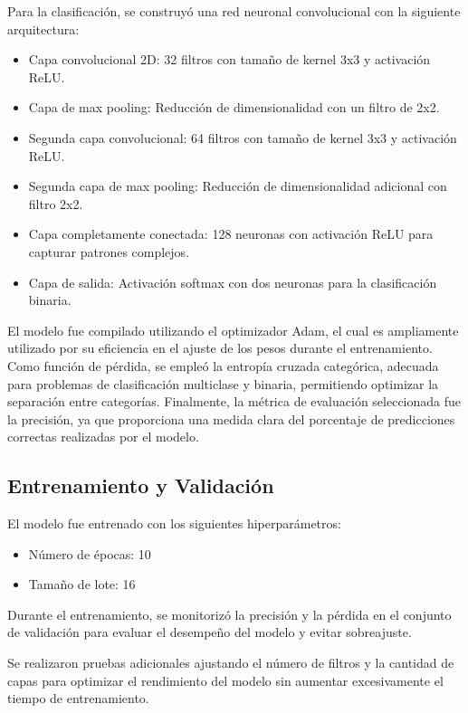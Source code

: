 \documentclass[journal]{IEEEtran}
\begin{document}
Para la clasificación, se construyó una red neuronal convolucional con la siguiente arquitectura:
\begin{itemize}
    \item Capa convolucional 2D: 32 filtros con tamaño de kernel 3x3 y activación ReLU.
    \item Capa de max pooling: Reducción de dimensionalidad con un filtro de 2x2.
    \item Segunda capa convolucional: 64 filtros con tamaño de kernel 3x3 y activación ReLU.
    \item Segunda capa de max pooling: Reducción de dimensionalidad adicional con filtro 2x2.
    \item Capa completamente conectada: 128 neuronas con activación ReLU para capturar patrones complejos.
    \item Capa de salida: Activación softmax con dos neuronas para la clasificación binaria.
\end{itemize}

El modelo fue compilado utilizando el optimizador Adam, el cual es ampliamente utilizado por su eficiencia en el ajuste de los pesos durante el entrenamiento. Como función de pérdida, se empleó la entropía cruzada categórica, adecuada para problemas de clasificación multiclase y binaria, permitiendo optimizar la separación entre categorías. Finalmente, la métrica de evaluación seleccionada fue la precisión, ya que proporciona una medida clara del porcentaje de predicciones correctas realizadas por el modelo.

\subsection{Entrenamiento y Validación}

El modelo fue entrenado con los siguientes hiperparámetros:
\begin{itemize}
    \item Número de épocas: 10
    \item Tamaño de lote: 16
\end{itemize}

Durante el entrenamiento, se monitorizó la precisión y la pérdida en el conjunto de validación para evaluar el desempeño del modelo y evitar sobreajuste.

Se realizaron pruebas adicionales ajustando el número de filtros y la cantidad de capas para optimizar el rendimiento del modelo sin aumentar excesivamente el tiempo de entrenamiento.
\end{document}
